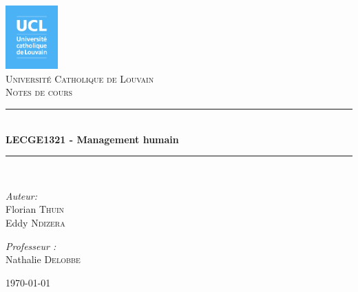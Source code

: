 \documentclass[12pt]{article}
\newcommand{\HRule}{\rule{\linewidth}{0.5mm}}
\begin{document}
\begin{titlepage}
\begin{center}

\includegraphics[width=0.15\textwidth]{./logo_ucl.png}~\\[1cm]

\textsc{\LARGE Université Catholique de Louvain}\\[1.5cm]

\textsc{\Large Notes de cours}\\[0.5cm]

\HRule \\[0.4cm]
{ \huge \bfseries LECGE1321 - Management humain \\[0.4cm] }

\HRule \\[1.5cm]

\noindent
\begin{minipage}[t]{0.4\textwidth}
\begin{flushleft} \large
\emph{Auteur:}\\
Florian \textsc{Thuin} \\
Eddy \textsc{Ndizera}
\end{flushleft}
\end{minipage}%
\begin{minipage}[t]{0.4\textwidth}
\begin{flushright} \large
\emph{Professeur :} \\
Nathalie \textsc{Delobbe}
\end{flushright}
\end{minipage}

\vfill

{\large \today}

\end{center}
\end{titlepage}

\tableofcontents
\end{document}
